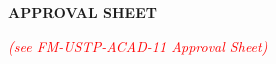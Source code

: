 
\begin{center}

    {\bfseries \hypertarget{approvalsheet}{APPROVAL SHEET} }

    \vspace{1\baselineskip}

    \textcolor{red}{\textit{(see FM-USTP-ACAD-11 Approval Sheet)}}

\end{center}

\clearpage{}